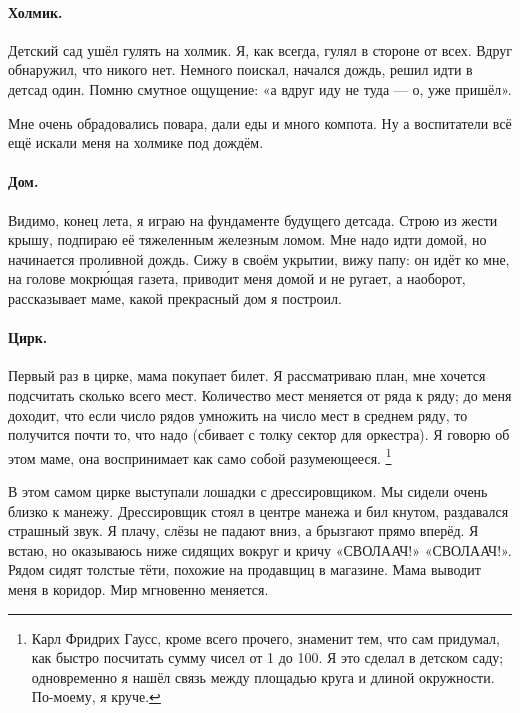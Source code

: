 \documentclass{book}
\begin{document}
\paragraph{Холмик.}
Детский сад ушёл гулять на холмик.
Я, как всегда, гулял в стороне от всех.
Вдруг обнаружил, что никого нет.
Немного поискал, начался дождь, решил идти в детсад один.
Помню смутное ощущение: «а вдруг иду не туда --- о, уже пришёл».

Мне очень обрадовались повара,
дали еды и много компота.
Ну а воспитатели всё ещё искали меня на холмике под дождём.

\paragraph{Дом.}
Видимо, конец лета, я играю на фундаменте будущего детсада.
Строю из жести крышу, подпираю её тяжеленным железным ломом.
Мне надо идти домой, но начинается проливной дождь.
Сижу в своём укрытии, вижу папу: он идёт ко мне, на голове мокр\'{ю}щая газета,
приводит меня домой и не ругает, а наоборот, рассказывает маме, какой прекрасный дом я построил.

\paragraph{Цирк.}
Первый раз в цирке, мама покупает билет.
Я рассматриваю план, мне хочется подсчитать сколько всего мест.
Количество мест меняется от ряда к ряду;
до меня доходит, что если число рядов умножить 
на число мест в среднем ряду, то получится почти то, что надо (сбивает с толку сектор для оркестра).
Я говорю об этом маме, она воспринимает как само собой разумеющееся.%
\footnote{
Карл Фридрих Гаусс, кроме всего прочего, знаменит тем,
что сам придумал, как быстро посчитать сумму чисел от 1 до 100.
Я это сделал в детском саду; одновременно я нашёл связь между площадью круга и длиной окружности. 
По-моему, я круче.}

В этом самом цирке выступали лошадки с дрессировщиком.
Мы сидели очень близко к манежу.
Дрессировщик стоял в центре манежа и бил кнутом, 
раздавался страшный звук.
Я плачу, слёзы не падают вниз,
а брызгают прямо вперёд.
Я встаю, но оказываюсь ниже сидящих вокруг и кричу «СВОЛААЧ!» «СВОЛААЧ!».
Рядом сидят толстые тёти, похожие на продавщиц в магазине.
Мама выводит меня в коридор.
Мир мгновенно меняется.


\end{document}

